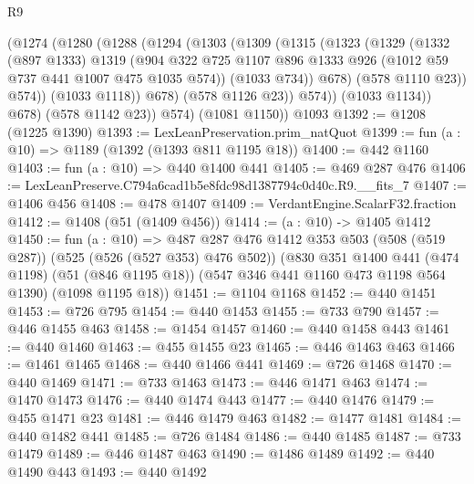 \begin{lexlean}{R9}
\begin{coremodule}
              (@1274
                (@1280
                  (@1288
                    (@1294
                      (@1303
                        (@1309
                          (@1315
                            (@1323
                              (@1329
                                (@1332
                                  (@897 @1333)
                                  @1319
                                  (@904
                                    @322
                                    @725
                                    @1107
                                    @896
                                    @1333
                                    @926
                                    (@1012 @59 @737 @441 @1007 @475 @1035 @574))
                                  (@1033 @734))
                                @678)
                              (@578 @1110 @23))
                            @574))
                        (@1033 @1118))
                      @678)
                    (@578 @1126 @23))
                  @574))
              (@1033 @1134))
            @678)
          (@578 @1142 @23))
        @574)
      (@1081 @1150))
    @1093
@1392 := @1208 (@1225 @1390)
@1393 := LexLeanPreservation.prim_natQuot
@1399 := fun (a : @10) => @1189 (@1392 (@1393 @811 @1195 @18))
@1400 := @442 @1160
@1403 := fun (a : @10) => @440 @1400 @441
@1405 := @469 @287 @476
@1406 := LexLeanPreserve.C794a6cad1b5e8fdc98d1387794c0d40c.R9.__fits_7
@1407 := @1406 @456
@1408 := @478 @1407
@1409 := VerdantEngine.ScalarF32.fraction
@1412 := @1408 (@51 (@1409 @456))
@1414 := (a : @10) -> @1405 @1412
@1450 := fun (a : @10) =>
  @487
    @287
    @476
    @1412
    @353
    @503
    (@508 (@519 @287))
    (@525 (@526 (@527 @353) @476 @502))
    (@830
      @351
      @1400
      @441
      (@474 @1198)
      (@51 (@846 @1195 @18))
      (@547 @346 @441 @1160 @473 @1198 @564 @1390)
      (@1098 @1195 @18))
@1451 := @1104 @1168
@1452 := @440 @1451
@1453 := @726 @795
@1454 := @440 @1453
@1455 := @733 @790
@1457 := @446 @1455 @463
@1458 := @1454 @1457
@1460 := @440 @1458 @443
@1461 := @440 @1460
@1463 := @455 @1455 @23
@1465 := @446 @1463 @463
@1466 := @1461 @1465
@1468 := @440 @1466 @441
@1469 := @726 @1468
@1470 := @440 @1469
@1471 := @733 @1463
@1473 := @446 @1471 @463
@1474 := @1470 @1473
@1476 := @440 @1474 @443
@1477 := @440 @1476
@1479 := @455 @1471 @23
@1481 := @446 @1479 @463
@1482 := @1477 @1481
@1484 := @440 @1482 @441
@1485 := @726 @1484
@1486 := @440 @1485
@1487 := @733 @1479
@1489 := @446 @1487 @463
@1490 := @1486 @1489
@1492 := @440 @1490 @443
@1493 := @440 @1492

\end{coremodule}
\end{lexlean}
